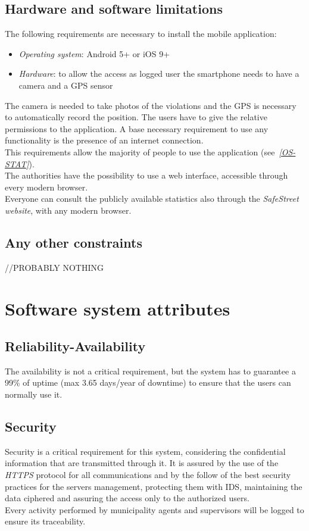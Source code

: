 \documentclass[a4paper]{report}
\begin{document}
\subsection{Hardware and software limitations}
The following requirements are necessary to install the mobile application:
\begin{itemize}
\item \textit{Operating system}: Android 5+ or iOS 9+
\item \textit{Hardware}: to allow the access as logged user the smartphone needs to have a camera and a GPS sensor
\end{itemize}
The camera is needed to take photos of the violations and the GPS is necessary to automatically record the position. The users have to give the relative permissions to the application. A base necessary requirement to use any functionality is the presence of an internet connection.\\
This requirements allow the majority of people to use the application \mbox{(see \hyperref[ref:os-stats]{\textit{[OS-STAT]}}).}\\
The authorities have the possibility to use a web interface, accessible through every modern browser.\\
Everyone can consult the publicly available statistics also through the \textit{SafeStreet website}, with any modern browser.
\subsection{Any other constraints}
//PROBABLY NOTHING
\section{Software system attributes}
\subsection{Reliability-Availability}
The availability is not a critical requirement, but the system has to guarantee a 99\% of uptime (max 3.65 days/year of downtime) to ensure that the users can normally use it.
\subsection{Security}
Security is a critical requirement for this system, considering the confidential information that are transmitted through it. It is assured by the use of the \textit{HTTPS} protocol for all communications and by the follow of the best security practices for the servers management, protecting them with IDS, maintaining the data ciphered and assuring the access only to the authorized users. \\
Every activity performed by municipality agents and supervisors will be logged to ensure its traceability.
\end{document}
